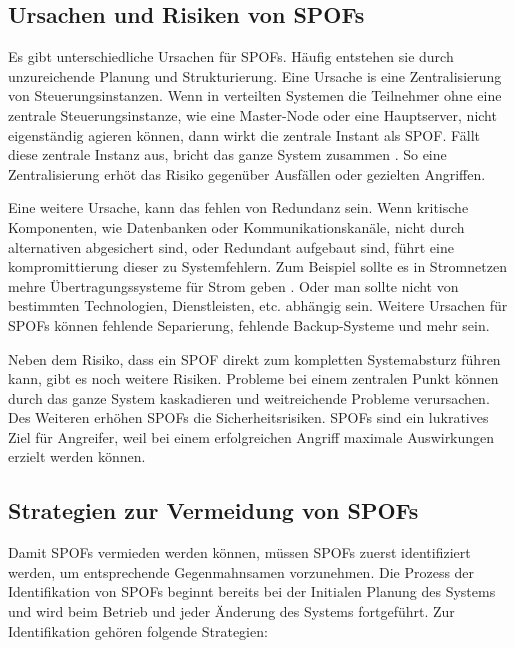 \documentclass[a4paper,12pt]{article}
\begin{document}
\subsection{Ursachen und Risiken von SPOFs}

Es gibt unterschiedliche Ursachen für SPOFs. Häufig entstehen sie durch unzureichende Planung und Strukturierung. Eine Ursache is eine Zentralisierung von Steuerungsinstanzen. Wenn in verteilten Systemen die Teilnehmer ohne eine zentrale Steuerungsinstanze, wie eine Master-Node oder eine Hauptserver, nicht eigenständig agieren können, dann wirkt die zentrale Instant als SPOF. Fällt diese zentrale Instanz aus, bricht das ganze System zusammen \cite[S. 253f.]{Steen2006}. So eine Zentralisierung erhöt das Risiko gegenüber Ausfällen oder gezielten Angriffen.

Eine weitere Ursache, kann das fehlen von Redundanz sein. Wenn kritische Komponenten, wie Datenbanken oder Kommunikationskanäle, nicht durch alternativen abgesichert sind, oder Redundant aufgebaut sind, führt eine kompromittierung dieser zu Systemfehlern. Zum Beispiel sollte es in Stromnetzen mehre Übertragungssysteme für Strom geben \cite[S. 61f.]{Jarass2009}. Oder man sollte nicht von bestimmten Technologien, Dienstleisten, etc. abhängig sein. Weitere Ursachen für SPOFs können fehlende Separierung, fehlende Backup-Systeme und mehr sein.

Neben dem Risiko, dass ein SPOF direkt zum kompletten Systemabsturz führen kann, gibt es noch weitere Risiken. Probleme bei einem zentralen Punkt können durch das ganze System kaskadieren und weitreichende Probleme verursachen. Des Weiteren erhöhen SPOFs die Sicherheitsrisiken. SPOFs sind ein lukratives Ziel für Angreifer, weil bei einem erfolgreichen Angriff maximale Auswirkungen erzielt werden können.

\subsection{Strategien zur Vermeidung von SPOFs}

Damit SPOFs vermieden werden können, müssen SPOFs zuerst identifiziert werden, um entsprechende Gegenmahnsamen vorzunehmen. Die Prozess der Identifikation von SPOFs beginnt bereits bei der Initialen Planung des Systems und wird beim Betrieb und jeder Änderung des Systems fortgeführt. Zur Identifikation gehören folgende Strategien:
\end{document}
